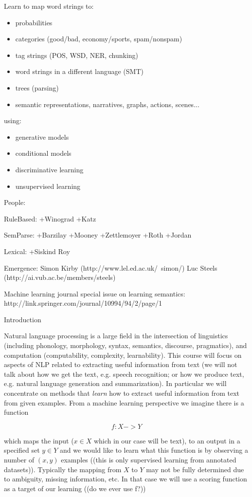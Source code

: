 \documentclass[ignorenonframetext]{beamer}
\begin{document}
Learn to map word strings to:
\begin{itemize}
\item probabilities
\item categories (good/bad, economy/sports, spam/nonspam)
\item tag strings (POS, WSD, NER, chunking)
\item word strings in a different language (SMT)
\item trees (parsing)
\item semantic representations, narratives, graphs, actions, scenes...
\end{itemize}
using:
\begin{itemize}
\item generative models
\item conditional models
\item discriminative learning
\item unsupervised learning
\end{itemize}

People:

RuleBased:
+Winograd
+Katz

SemParse:
+Barzilay
+Mooney
+Zettlemoyer
+Roth
+Jordan

Lexical:
+Siskind
Roy

Emergence:
Simon Kirby (http://www.lel.ed.ac.uk/~simon/)
Luc Steels (http://ai.vub.ac.be/members/steels)

Machine learning journal special issue on learning semantics:
http://link.springer.com/journal/10994/94/2/page/1

Introduction

Natural language processing is a large field in the intersection of
linguistics (including phonology, morphology, syntax, semantics,
discourse, pragmatics), and computation (computability, complexity,
learnability).  This course will focus on aspects of NLP related to
extracting useful information from text (we will not talk about how we
get the text, e.g. speech recognition; or how we produce text,
e.g. natural language generation and summarization).  In particular we
will concentrate on methods that {\em learn} how to extract useful
information from text from given examples.  From a machine learning
perspective we imagine there is a function 

\[ f: X -> Y \]

which maps the input ($x \in X$ which in our case will be text), to an
output in a specified set $y \in Y$ and we would like to learn what
this function is by observing a number of $(x, y)$ examples ((this is
only supervised learning from annotated datasets)).  Typically the
mapping from $X$ to $Y$ may not be fully determined due to ambiguity,
missing information, etc.  In that case we will use a scoring function
as a target of our learning ((do we ever use f?))
\end{document}
